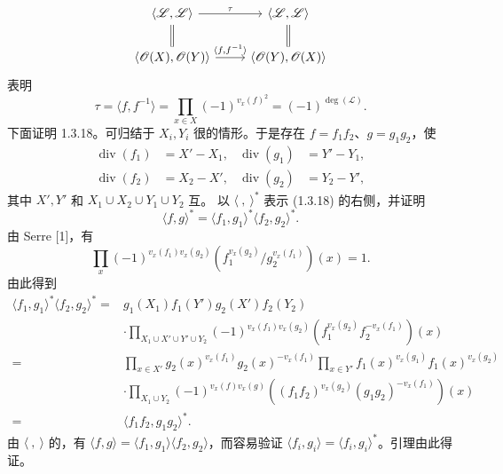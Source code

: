 \[\begin{tikzcd}\langle\mathscr L,\mathscr L\rangle\ar[r,"\tau"]\ar[d,equal]&\langle\mathscr L,\mathscr L\rangle\ar[d,equal]\\\langle\mathscr O(X),\mathscr O(Y)\rangle\ar[r,"{\langle f,f^{-1}\rangle}"]&\langle\mathscr O(Y),\mathscr O(X)\rangle\end{tikzcd}\]
表明
\[\tau=\langle f,f^{-1}\rangle=\prod_{x\in X}(-1)^{v_x(f)^2}=(-1)^{\deg(\mathscr L)}.\]
下面证明 1.3.18。可归结于 $X_i,Y_i$ 很的情形。于是存在 $f=f_1f_2$、$g=g_1g_2$，使
\[\begin{aligned}\operatorname{div}(f_1)&=X'-X_1,&\operatorname{div}(g_1)&=Y'-Y_1,\\\operatorname{div}(f_2)&=X_2-X',&\operatorname{div}(g_2)&=Y_2-Y',\end{aligned}\]
其中 $X',Y'$ 和 $X_1\cup X_2\cup Y_1\cup Y_2$ 互。
以 $\langle\ ,\ \rangle^*$ 表示 (1.3.18) 的右侧，并证明
\[\langle f,g\rangle^*=\langle f_1,g_1\rangle^*\langle f_2,g_2\rangle^*.\]
由 Serre [1]，有
\begin{equation}\prod_x(-1)^{v_x(f_1)v_x(g_2)}(f_1^{v_x(g_2)}/g_2^{v_x(f_1)})(x)=1.\tag{1.3.18.1}\end{equation}
由此得到
\[\begin{aligned}
\langle f_1,g_1\rangle^*\langle f_2,g_2\rangle^*
={}&g_1(X_1)f_1(Y')g_2(X')f_2(Y_2)\\
&\cdot\prod_{X_1\cup X'\cup Y'\cup Y_2}(-1)^{v_x(f_1)v_x(g_2)}(f_1^{v_x(g_2)}f_2^{-v_x(f_1)})(x)\\
={}&\prod_{x\in X'}g_2(x)^{v_x(f_1)}g_2(x)^{-v_x(f_1)}
\prod_{x\in Y'}f_1(x)^{v_x(g_1)}f_1(x)^{v_x(g_2)}\\
&\cdot\prod_{X_1\cup Y_2}(-1)^{v_x(f)v_x(g)}((f_1f_2)^{v_x(g_2)}(g_1g_2)^{-v_x(f_1)})(x)\\
={}&\langle f_1f_2,g_1g_2\rangle^*.
\end{aligned}\]
由 $\langle\ ,\ \rangle$ 的，有 $\langle f,g\rangle=\langle f_1,g_1\rangle\langle f_2,g_2\rangle$，而容易验证 $\langle f_i,g_i\rangle=\langle f_i,g_i\rangle^*$。引理由此得证。
